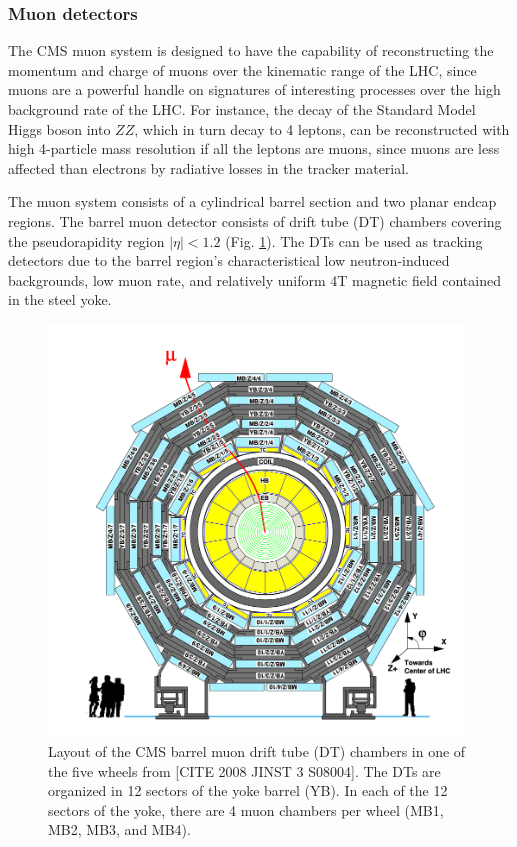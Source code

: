 \documentclass{article}
\begin{document}
\subsubsection{Muon detectors}

The CMS muon system is designed to have the capability of reconstructing the momentum and charge of muons over the kinematic range of the LHC, since muons are a powerful handle on signatures of interesting processes over the high background rate of the LHC. For instance, the decay of the Standard Model Higgs boson into $ZZ$, which in turn decay to 4 leptons, can be reconstructed with high 4-particle mass resolution if all the leptons are muons, since muons are less affected than electrons by radiative losses in the tracker material. 

The muon system consists of a cylindrical barrel section and two planar endcap regions. The barrel muon detector consists of drift tube (DT) chambers covering the pseudorapidity region $|\eta| < 1.2$ (Fig. \ref{fig:phase-1-muon-barrel-DT-schematic}). The DTs can be used as tracking detectors due to the barrel region's characteristical low neutron-induced backgrounds, low muon rate, and relatively uniform 4T magnetic field contained in the steel yoke. 

\begin{figure}[ht]
    \centering
    \includegraphics[width=11cm]{figures/phase-1-muon-barrel-DT-schematic.png}
    \caption{Layout of the CMS barrel muon drift tube (DT) chambers in one of the five wheels from [CITE 2008 JINST 3 S08004]. The DTs are organized in 12 sectors of the yoke barrel (YB). In each of the 12 sectors of the yoke, there are 4 muon chambers per wheel (MB1, MB2, MB3, and MB4).}
    \label{fig:phase-1-muon-barrel-DT-schematic}
\end{figure}
\end{document}
